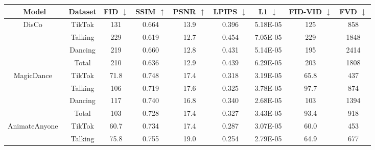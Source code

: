 \begin{table*}[htb]
\centering\small
\begin{tabular}{c|c|ccccc|cc}
\Xhline{1pt}
\noindent\textbf{Model}        & \noindent\textbf{Dataset} & \noindent\textbf{FID}  $\downarrow$   & \noindent\textbf{SSIM}   $\uparrow$ & \noindent\textbf{PSNR}   $\uparrow$  & \noindent\textbf{LPIPS}  $\downarrow$  & \noindent\textbf{L1}    $\downarrow$  & \noindent\textbf{FID-VID}  $\downarrow$  & \noindent\textbf{FVD}  $\downarrow$   \\ \hline
\multirow{4}{*}{DisCo~\cite{wang2024disco}}  & TikTok              & 131 & 0.664              & 13.9& 0.396              & 5.18E-05   & 125        & 858\\ 
       & Talking & 229 & 0.619              & 12.7& 0.454              & 7.05E-05   & 229        & 1848              \\ 
       & Dancing              & 219 & 0.660              & 12.8& 0.431              & 5.14E-05     & 195      & 2414              \\ 
       & \cellcolor[HTML]{F0F0F0} Total             &\cellcolor[HTML]{F0F0F0} 210 &\cellcolor[HTML]{F0F0F0} 0.636              & \cellcolor[HTML]{F0F0F0} 12.9&\cellcolor[HTML]{F0F0F0} 0.439             &\cellcolor[HTML]{F0F0F0} 6.29E-05     &\cellcolor[HTML]{F0F0F0} 203      &\cellcolor[HTML]{F0F0F0} 1808             \\ \hline
\multirow{4}{*}{MagicDance~\cite{chang2023magicdance}}            & TikTok              & 71.8& 0.748              & 17.4& 0.318              & 3.19E-05     & 65.8     & 437\\ 
       & Talking & 106 & 0.719              & 17.6& 0.325              & 3.78E-05  &  97.7       & 874\\ 
       & Dancing              & 117  & 0.740    & 16.8& 0.340              & 2.68E-05  &  103       & 1394              \\ 
       &\cellcolor[HTML]{F0F0F0} Total &\cellcolor[HTML]{F0F0F0} 103 &\cellcolor[HTML]{F0F0F0} 0.728              &\cellcolor[HTML]{F0F0F0} 17.4&\cellcolor[HTML]{F0F0F0} 0.327              & \cellcolor[HTML]{F0F0F0} 3.43E-05  &\cellcolor[HTML]{F0F0F0} 93.4         &\cellcolor[HTML]{F0F0F0} 918\\ \hline
\multirow{4}{*}{AnimateAnyone~\cite{hu2024animate}}          & TikTok              & 60.7        & 0.734    & 17.4  & 0.287              & 3.07E-05    & 60.0       & 453\\ 
       & Talking & 75.8& 0.755    & 19.0  & 0.254              & 2.79E-05        & 64.9   & 677\\ 

\end{tabular}
\end{table*}
